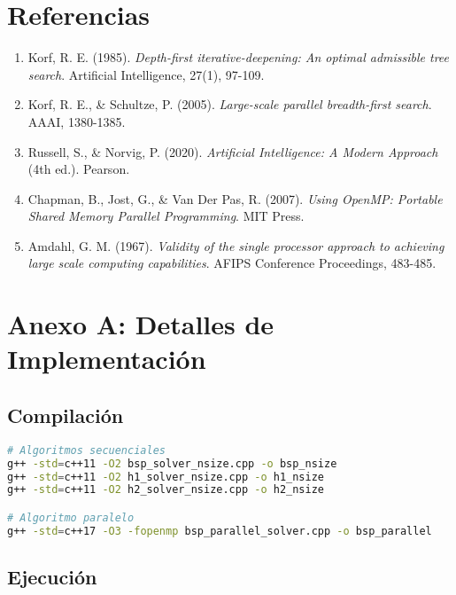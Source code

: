 \documentclass[12pt,a4paper]{article}
\begin{document}
\section{Referencias}

\begin{enumerate}
    \item Korf, R. E. (1985). \textit{Depth-first iterative-deepening: An optimal admissible tree search}. Artificial Intelligence, 27(1), 97-109.
    
    \item Korf, R. E., \& Schultze, P. (2005). \textit{Large-scale parallel breadth-first search}. AAAI, 1380-1385.
    
    \item Russell, S., \& Norvig, P. (2020). \textit{Artificial Intelligence: A Modern Approach} (4th ed.). Pearson.
    
    \item Chapman, B., Jost, G., \& Van Der Pas, R. (2007). \textit{Using OpenMP: Portable Shared Memory Parallel Programming}. MIT Press.
    
    \item Amdahl, G. M. (1967). \textit{Validity of the single processor approach to achieving large scale computing capabilities}. AFIPS Conference Proceedings, 483-485.
\end{enumerate}

\appendix

\section{Anexo A: Detalles de Implementación}

\subsection{Compilación}

\begin{lstlisting}[language=bash]
# Algoritmos secuenciales
g++ -std=c++11 -O2 bsp_solver_nsize.cpp -o bsp_nsize
g++ -std=c++11 -O2 h1_solver_nsize.cpp -o h1_nsize
g++ -std=c++11 -O2 h2_solver_nsize.cpp -o h2_nsize

# Algoritmo paralelo
g++ -std=c++17 -O3 -fopenmp bsp_parallel_solver.cpp -o bsp_parallel
\end{lstlisting}

\subsection{Ejecución}
\end{document}
